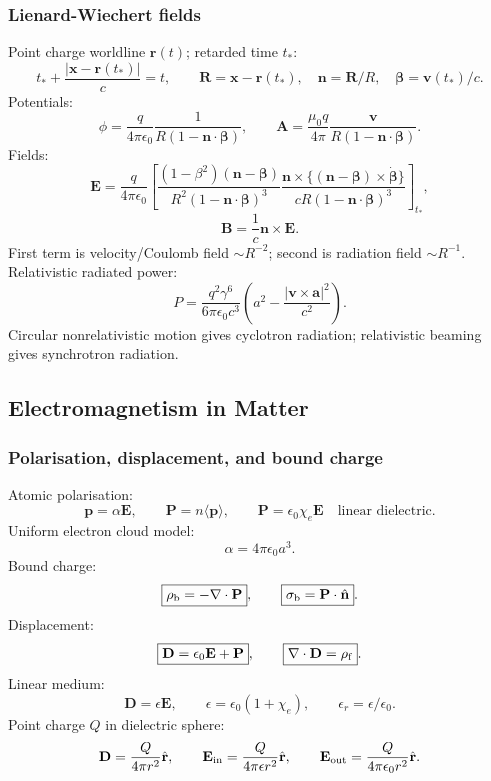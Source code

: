 \subsubsection*{Lienard-Wiechert fields}
Point charge worldline $\mathbf r(t)$; retarded time $t_\ast$:
\[
t_\ast+\frac{|\mathbf x-\mathbf r(t_\ast)|}{c}=t,\qquad
\mathbf R=\mathbf x-\mathbf r(t_\ast),\quad
\mathbf n=\mathbf R/R,\quad \boldsymbol\beta=\mathbf v(t_\ast)/c.
\]
Potentials:
\[
\boxed{\phi=\frac{q}{4\pi\epsilon_0}\frac{1}{R(1-\mathbf n\cdot\boldsymbol\beta)}},\qquad
\boxed{\mathbf A=\frac{\mu_0q}{4\pi}\frac{\mathbf v}{R(1-\mathbf n\cdot\boldsymbol\beta)}}.
\]
Fields:
\[
\mathbf E=\frac{q}{4\pi\epsilon_0}\left[
\frac{(1-\beta^2)(\mathbf n-\boldsymbol\beta)}
{R^2(1-\mathbf n\cdot\boldsymbol\beta)^3}
\frac{\mathbf n\times\{(\mathbf n-\boldsymbol\beta)\times\dot{\boldsymbol\beta}\}}
{cR(1-\mathbf n\cdot\boldsymbol\beta)^3}\right]_{t_\ast},
\]
\[
\boxed{\mathbf B=\frac{1}{c}\mathbf n\times\mathbf E}.
\]
First term is velocity/Coulomb field $\sim R^{-2}$; second is radiation field $\sim R^{-1}$.
Relativistic radiated power:
\[
\boxed{P=\frac{q^2\gamma^6}{6\pi\epsilon_0c^3}
\left(a^2-\frac{|\mathbf v\times\mathbf a|^2}{c^2}\right)}.
\]
Circular nonrelativistic motion gives cyclotron radiation; relativistic beaming gives synchrotron radiation.

\subsection{Electromagnetism in Matter}

\subsubsection*{Polarisation, displacement, and bound charge}
Atomic polarisation:
\[
\mathbf p=\alpha\mathbf E,\qquad
\mathbf P=n\langle\mathbf p\rangle,\qquad
\mathbf P=\epsilon_0\chi_e\mathbf E\quad\text{linear dielectric}.
\]
Uniform electron cloud model:
\[
\alpha=4\pi\epsilon_0a^3.
\]
Bound charge:
\[
\boxed{\rho_{\rm b}=-\nabla\cdot\mathbf P},\qquad
\boxed{\sigma_{\rm b}=\mathbf P\cdot\hat{\mathbf n}}.
\]
Displacement:
\[
\boxed{\mathbf D=\epsilon_0\mathbf E+\mathbf P},\qquad
\boxed{\nabla\cdot\mathbf D=\rho_{\rm f}}.
\]
Linear medium:
\[
\mathbf D=\epsilon\mathbf E,\qquad
\epsilon=\epsilon_0(1+\chi_e),\qquad
\epsilon_r=\epsilon/\epsilon_0.
\]
Point charge $Q$ in dielectric sphere:
\[
\mathbf D=\frac{Q}{4\pi r^2}\hat{\mathbf r},\qquad
\mathbf E_{\rm in}=\frac{Q}{4\pi\epsilon r^2}\hat{\mathbf r},\qquad
\mathbf E_{\rm out}=\frac{Q}{4\pi\epsilon_0r^2}\hat{\mathbf r}.
\]

